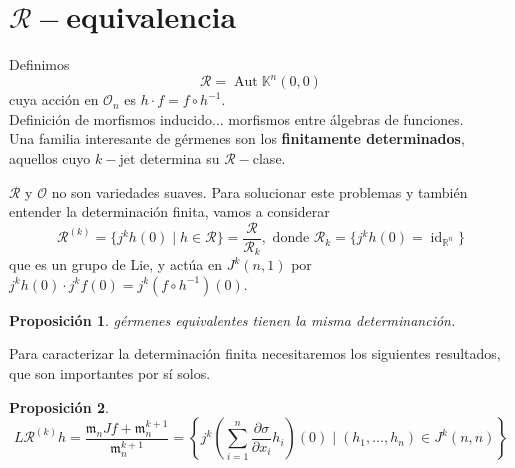 \documentclass[12pt]{book}
\newtheorem{pro}{Proposición}
\newtheorem{ex}{Ejercicio}
\newcommand{\kk}{\mathbb{K}}
\newcommand{\rg}{\mathcal{R}}
\newcommand{\jku}{J^k(n,1)}
\begin{document}




\section{$\rg-$equivalencia}


Definimos
$$ \rg = \operatorname{Aut} \kk^n (0,0)$$
cuya acción en $\mathcal{O}_n$ es $ h \cdot f = f \circ h^{-1} $.\\
Definición de morfismos inducido... morfismos entre álgebras de funciones.\\

Una familia interesante de gérmenes son los\textbf{ finitamente determinados}, aquellos cuyo $k-$jet determina su $\rg-$clase.

$\rg$ y $\mathcal{O}$ no son variedades suaves. Para solucionar este problemas y también entender la determinación finita, vamos a considerar $$ \rg ^{(k)} = \{ j^k h (0) \; | \; h \in \mathcal{R} \}  = \frac{\rg}{\rg _k}, \mbox{ donde } \rg _k = \{ j^k h(0) = \operatorname{id}_{\mathbb{R}^n} \}  $$
que es un grupo de Lie, y actúa en $ \jku $ por $ j^k h (0) \cdot j^k f(0) = j^k (f \circ h ^{-1}) (0)$.

\begin{pro}
gérmenes equivalentes tienen la misma determinanción.
\end{pro}

Para caracterizar la determinación finita necesitaremos los siguientes resultados, que son importantes por sí solos.






%




\begin{pro}\label{tanrk}
$$ L \mathcal{R} ^{(k)} h = \frac{\mathfrak{m}_n J f + \mathfrak{m}_n ^{k+1}}{\mathfrak{m}_n ^{k+1}} =\left\{j^{k}\left(\sum_{i=1}^{n} \frac{\partial \sigma}{\partial x_{i}} h_{i}\right) (0)  \; | \; \left(h_{1}, \ldots, h_{n}\right) \in J^{k}(n, n)\right\}  $$
\end{pro}
\end{document}

